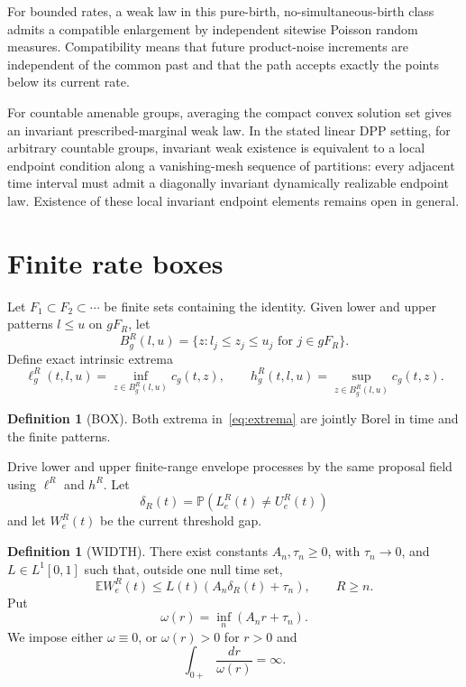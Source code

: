 \documentclass[11pt]{article}
\theoremstyle{definition}
\newtheorem{definition}[theorem]{Definition}
\theoremstyle{remark}
\newcommand{\E}{\mathbb{E}}
\newcommand{\Pp}{\mathbb{P}}
\newcommand{\1}{\mathbf{1}}
\begin{document}
For bounded rates, a weak law in this pure-birth, no-simultaneous-birth class
admits a compatible enlargement by independent sitewise Poisson random
measures.  Compatibility means that future product-noise increments are
independent of the common past and that the path accepts exactly the points
below its current rate.

For countable amenable groups, averaging the compact convex solution set gives
an invariant prescribed-marginal weak law.  In the stated linear DPP setting,
for arbitrary countable groups, invariant weak existence is equivalent to a
local endpoint condition along a vanishing-mesh sequence of partitions:
every adjacent time interval must admit a diagonally invariant dynamically
realizable endpoint law.  Existence of these local invariant endpoint
elements remains open in general.

\section{Finite rate boxes}

Let $F_1\subset F_2\subset\cdots$ be finite sets containing the identity.
Given lower and upper patterns $l\le u$ on $gF_R$, let
\[
 B_g^R(l,u)=\{z:l_j\le z_j\le u_j\text{ for }j\in gF_R\}.
\]
Define exact intrinsic extrema
\begin{equation}
 \ell_g^R(t,l,u)=\inf_{z\in B_g^R(l,u)}c_g(t,z),\qquad
 h_g^R(t,l,u)=\sup_{z\in B_g^R(l,u)}c_g(t,z).
 \label{eq:extrema}
\end{equation}

\begin{definition}[BOX]
Both extrema in~\eqref{eq:extrema} are jointly Borel in time and the finite
patterns.
\end{definition}

Drive lower and upper finite-range envelope processes by the same proposal
field using $\ell^R$ and $h^R$.  Let
\[
 \delta_R(t)=\Pp(L_e^R(t)\ne U_e^R(t))
\]
and let $W_e^R(t)$ be the current threshold gap.

\begin{definition}[WIDTH]
There exist constants $A_n,\tau_n\ge0$, with $\tau_n\to0$, and
$L\in L^1[0,1]$ such that, outside one null time set,
\begin{equation}
 \E W_e^R(t)\le L(t)(A_n\delta_R(t)+\tau_n),\qquad R\ge n.
 \label{eq:width}
\end{equation}
Put
\[
 \omega(r)=\inf_n(A_nr+\tau_n).
\]
We impose either $\omega\equiv0$, or $\omega(r)>0$ for $r>0$ and
\begin{equation}
 \int_{0+}\frac{dr}{\omega(r)}=\infty.
 \label{eq:osgood}
\end{equation}
\end{definition}
\end{document}
